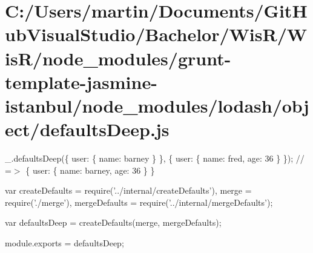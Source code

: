 \hypertarget{_c_1_2_users_2martin_2_documents_2_git_hub_visual_studio_2_bachelor_2_wis_r_2_wis_r_2node_module5b111c407d0cda69564a2989500dd9fe}{}\section{C\+:/\+Users/martin/\+Documents/\+Git\+Hub\+Visual\+Studio/\+Bachelor/\+Wis\+R/\+Wis\+R/node\+\_\+modules/grunt-\/template-\/jasmine-\/istanbul/node\+\_\+modules/lodash/object/defaults\+Deep.\+js}
\+\_\+.\+defaults\+Deep(\{ \textquotesingle{}user\textquotesingle{}\+: \{ \textquotesingle{}name\textquotesingle{}\+: \textquotesingle{}barney\textquotesingle{} \} \}, \{ \textquotesingle{}user\textquotesingle{}\+: \{ \textquotesingle{}name\textquotesingle{}\+: \textquotesingle{}fred\textquotesingle{}, \textquotesingle{}age\textquotesingle{}\+: 36 \} \}); // =$>$ \{ \textquotesingle{}user\textquotesingle{}\+: \{ \textquotesingle{}name\textquotesingle{}\+: \textquotesingle{}barney\textquotesingle{}, \textquotesingle{}age\textquotesingle{}\+: 36 \} \}


\begin{DoxyCodeInclude}
var createDefaults = require(\textcolor{stringliteral}{'../internal/createDefaults'}),
    merge = require(\textcolor{stringliteral}{'./merge'}),
    mergeDefaults = require(\textcolor{stringliteral}{'../internal/mergeDefaults'});

var defaultsDeep = createDefaults(merge, mergeDefaults);

module.exports = defaultsDeep;
\end{DoxyCodeInclude}
 